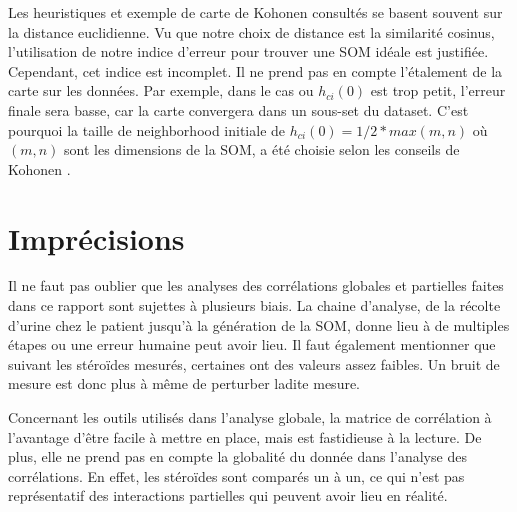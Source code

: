 	Les heuristiques et exemple de carte de Kohonen consultés se basent souvent sur la distance euclidienne. Vu que notre choix de distance est la similarité cosinus, l'utilisation de notre indice d'erreur pour trouver une SOM idéale est justifiée. Cependant, cet indice est incomplet. Il ne prend pas en compte l'étalement de la carte sur les données. Par exemple, dans le cas ou $h_{ci}(0)$ est trop petit, l'erreur finale sera basse, car la carte convergera dans un sous-set du dataset. C'est pourquoi la taille de neighborhood initiale de $h_{ci}(0) = 1/2*max(m, n)$ où $(m, n)$ sont les dimensions de la SOM, a été choisie selon les conseils de Kohonen \cite{Kohonen:1995}.


\section{Imprécisions}

	Il ne faut pas oublier que les analyses des corrélations globales et partielles faites dans ce rapport sont sujettes à plusieurs biais. La chaine d'analyse, de la récolte d'urine chez le patient jusqu'à la génération de la SOM, donne lieu à de multiples étapes ou une erreur humaine peut avoir lieu. Il faut également mentionner que suivant les stéroïdes mesurés, certaines ont des valeurs assez faibles. Un bruit de mesure est donc plus à même de perturber ladite mesure. 

	Concernant les outils utilisés dans l'analyse globale, la matrice de corrélation à l'avantage d'être facile à mettre en place, mais est fastidieuse à la lecture. De plus, elle ne prend pas en compte la globalité du donnée dans l'analyse des corrélations. En effet, les stéroïdes sont comparés un à un, ce qui n'est pas représentatif des interactions partielles qui peuvent avoir lieu en réalité. 


